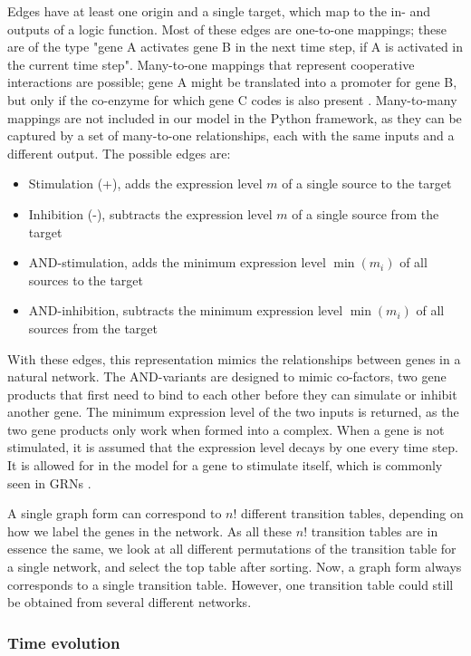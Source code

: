 \documentclass[../main.tex]{subfiles}
\begin{document}
Edges have at least one origin and a single target, which map to the in- and outputs of a logic function.
Most of these edges are one-to-one mappings; these are of the type "gene A activates gene B in the next time step, if A is activated in the current time step".
Many-to-one mappings that represent cooperative interactions are possible; gene A might be translated into a promoter for gene B, but only if the co-enzyme for which gene C codes is also present \cite{bolouri2002modeling, de2002modeling}.
Many-to-many mappings are not included in our model in the Python framework, as they can be captured by a set of many-to-one relationships, each with the same inputs and a different output.
The possible edges are:
%
\begin{itemize}
\item Stimulation (+), adds the expression level $m$ of a single source to the target
\item Inhibition (-), subtracts the expression level $m$ of a single source from the target
\item AND-stimulation, adds the minimum expression level $\min(m_i)$ of all sources to the target
\item AND-inhibition, subtracts the minimum expression level $\min(m_i)$ of all sources from the target
\end{itemize}
%
With these edges, this representation mimics the relationships between genes in a natural network.
The AND-variants are designed to mimic co-factors, two gene products that first need to bind to each other before they can simulate or inhibit another gene.
The minimum expression level of the two inputs is returned, as the two gene products only work when formed into a complex.
When a gene is not stimulated, it is assumed that the expression level decays by one every time step.
It is allowed for in the model for a gene to stimulate itself, which is commonly seen in GRNs \cite{thomas1995dynamical, zhou2016relative}.

A single graph form can correspond to $n!$ different transition tables, depending on how we label the genes in the network.
As all these $n!$ transition tables are in essence the same, we look at all different permutations of the transition table for a single network, and select the top table after sorting.
Now, a graph form always corresponds to a single transition table.
However, one transition table could still be obtained from several different networks.

\subsubsection{Time evolution}
\end{document}

